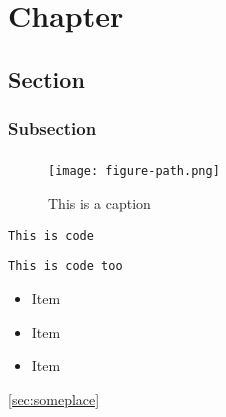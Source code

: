 
\chapter{Chapter}
\section{Section}
\subsection{Subsection}

\paragraph{}
\paragraph{}
\paragraph{} %


\begin{figure}[H]
\centering
\texttt{[image: figure-path.png]}
\caption{This is a caption}
\end{figure}


\lstinline{This is code}


\begin{lstlisting}
This is code too
\end{lstlisting}


\begin{itemize}
    \item Item
    \item Item
    \item Item %
\end{itemize}


\cite{1}


\label{sec:someplace}
\ref{sec:someplace}